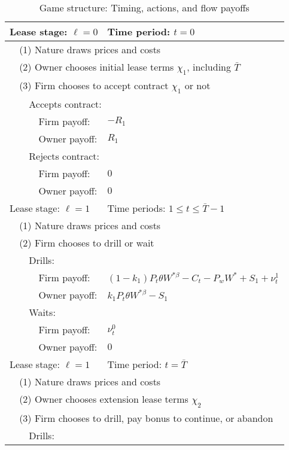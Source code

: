 \documentclass[12pt]{article}
\begin{document}
\begin{table}[!htbp]
\centering
\caption{Game structure: Timing, actions, and flow payoffs}
\begin{tabular}{l l l l l}
\hline \hline
\multicolumn{4}{l}{Lease stage: $\ell = 0$} & Time period: $t = 0$ \\
\hline
{} & \multicolumn{4}{l}{(1) Nature draws prices and costs}\\
{} & \multicolumn{4}{l}{(2) Owner chooses initial lease terms $\chi_1$, including $\bar{T}$}\\
{} & \multicolumn{4}{l}{(3) Firm chooses to accept contract $\chi_1$ or not}\\
{} & {} & \multicolumn{3}{l}{Accepts contract:}\\
{\; \;} & {\; \; \;} & {\; \;} & Firm payoff: & $-R_1$ \\
{} & {} & {} & Owner payoff: & $R_1$ \\
{} & {} & \multicolumn{3}{l}{Rejects contract:}\\
{} & {} & {} & Firm payoff: & $0$ \\
{} & {} & {} & Owner payoff: & $0$ \\
\hline \hline
\multicolumn{4}{l}{Lease stage: $\ell = 1$} & Time periods: $1 \leq t \leq \bar{T}-1$ \\
\hline
{} & \multicolumn{4}{l}{(1) Nature draws prices and costs}\\
{} & \multicolumn{4}{l}{(2) Firm chooses to drill or wait}\\
{} & {} & \multicolumn{3}{l}{Drills:}\\
{} & {} & {} & Firm payoff: & $(1 - k_1) P_t \theta W^{*\beta} - C_t - P_w W^*+ S_1  + \nu^1_t$ \\
{} & {} & {} & Owner payoff: & $k_1 P_t \theta W^{*\beta} - S_1$ \\
{} & {} & \multicolumn{3}{l}{Waits:}\\
{} & {} & {} & Firm payoff: & $ \nu^0_t$ \\
{} & {} & {} & Owner payoff: & $0$ \\
\hline \hline
\multicolumn{4}{l}{Lease stage: $\ell = 1$} & Time period: $t = \bar{T}$\\
\hline
{} & \multicolumn{4}{l}{(1) Nature draws prices and costs}\\
{} & \multicolumn{4}{l}{(2) Owner chooses extension lease terms $\chi_2$}\\
{} & \multicolumn{4}{l}{(3) Firm chooses to drill, pay bonus to continue, or abandon}\\
{} & {} & \multicolumn{3}{l}{Drills:}\\

\end{tabular}
\end{table}
\end{document}

